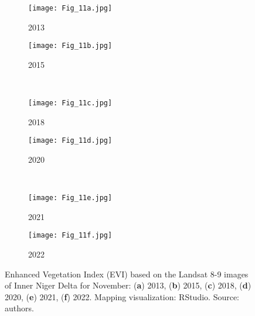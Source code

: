 \documentclass[12pt,a4paper,oneside]{article}
\begin{document}
\begin{figure}[H]
	\begin{subfigure}[b]{.5\textwidth}
		\centering
			\texttt{[image: Fig\_11a.jpg]}
		\caption{2013}
	\end{subfigure}%
	\begin{subfigure}[b]{.5\textwidth}
		\centering
		\texttt{[image: Fig\_11b.jpg]}
		\caption{2015}
	\end{subfigure}%
\\
\vfill \vspace{1mm}
	\begin{subfigure}[b]{.5\textwidth}
		\centering
			\texttt{[image: Fig\_11c.jpg]}
		\caption{2018}
	\end{subfigure}%
	\begin{subfigure}[b]{.5\textwidth}
		\centering
		\texttt{[image: Fig\_11d.jpg]}
		\caption{2020}
	\end{subfigure}%
\\
\vfill \vspace{1mm}
	\begin{subfigure}[b]{.5\textwidth}
		\centering
			\texttt{[image: Fig\_11e.jpg]}
		\caption{2021}
	\end{subfigure}%
	\begin{subfigure}[b]{.5\textwidth}
		\centering
		\texttt{[image: Fig\_11f.jpg]}
		\caption{2022}
	\end{subfigure}%
\vspace*{20pt}\caption{Enhanced Vegetation Index (EVI) based on the Landsat 8-9 images of Inner Niger Delta for November: (\textbf{a}) 2013, (\textbf{b}) 2015, (\textbf{c}) 2018, (\textbf{d}) 2020, (\textbf{e}) 2021, (\textbf{f}) 2022. Mapping visualization: RStudio. Source: authors.}\label{fig11}
\end{figure}
\end{document}

